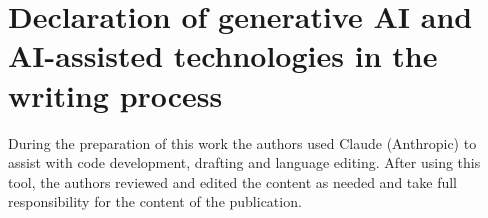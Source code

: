 \documentclass[preprint,12pt]{elsarticle}
\begin{document}
\section*{Declaration of generative AI and AI-assisted technologies in the writing process}
During the preparation of this work the authors used Claude (Anthropic) to assist with code
development, drafting and language editing. After using this tool, the authors reviewed and
edited the content as needed and take full responsibility for the content of the publication.



\end{document}
